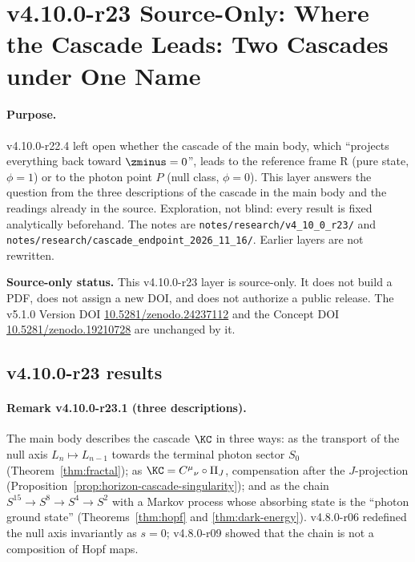 
\clearpage
\section*{v4.10.0-r23 Source-Only: Where the Cascade Leads: Two Cascades under One Name}
\label{sec:v4100-r23-cascade-endpoint}

\paragraph{Purpose.}
v4.10.0-r22.4 left open whether the cascade of the main body, which ``projects everything back toward \(\zminus=0\)'', leads to the
reference frame R (pure state, \(\phi=1\)) or to the photon point \(P\) (null class, \(\phi=0\)).  This layer answers the question from the
three descriptions of the cascade in the main body and the readings already in the source.  Exploration, not blind: every result is
fixed analytically beforehand.  The notes are \texttt{notes/\allowbreak research/\allowbreak v4\_10\_0\_r23/} and
\texttt{notes/\allowbreak research/\allowbreak cascade\_endpoint\_2026\_11\_16/}.  Earlier layers are not rewritten.

\noindent\textbf{Source-only status.}
This v4.10.0-r23 layer is source-only.  It does not build a PDF, does not assign a new DOI,
and does not authorize a public release.  The v5.1.0 Version DOI
\href{https://doi.org/10.5281/zenodo.24237112}{10.5281/zenodo.24237112} and the Concept DOI
\href{https://doi.org/10.5281/zenodo.19210728}{10.5281/zenodo.19210728} are unchanged by it.

\subsection*{v4.10.0-r23 results}
\label{subsec:v4100-r23-results}

\paragraph{Remark v4.10.0-r23.1 (three descriptions).}
The main body describes the cascade \(\KC\) in three ways: as the transport of the null axis \(L_n\mapsto L_{n-1}\) towards the terminal
photon sector \(S_0\) (Theorem~\ref{thm:fractal}); as \(\KC=C^\mu{}_\nu\circ\Pi_J\), compensation after the \(J\)-projection
(Proposition~\ref{prop:horizon-cascade-singularity}); and as the chain \(S^{15}\to S^8\to S^4\to S^2\) with a Markov process whose absorbing
state is the ``photon ground state'' (Theorems~\ref{thm:hopf} and \ref{thm:dark-energy}).  v4.8.0-r06 redefined the null axis invariantly as
\(s=0\); v4.8.0-r09 showed that the chain is not a composition of Hopf maps.

